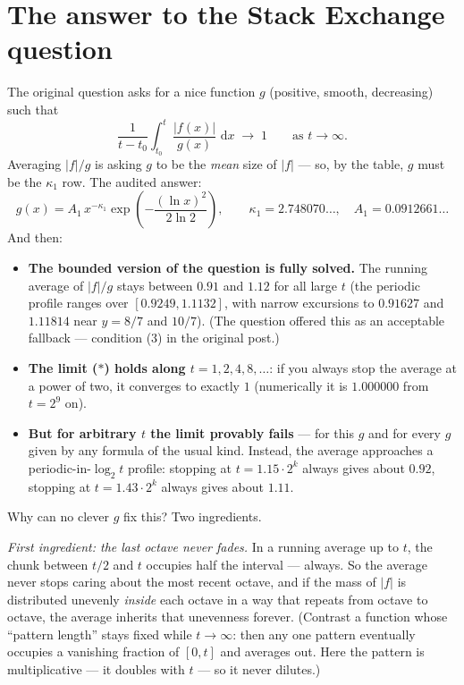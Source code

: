 \documentclass[11pt,oneside]{article}
\theoremstyle{remark}
\newcommand{\dd}{\,\mathrm d}
\begin{document}
\section{The answer to the Stack Exchange question}
\label{sec:answer}

The original question asks for a nice function $g$ (positive, smooth,
decreasing) such that
\[
 \frac{1}{t-t_0}\int_{t_0}^{t}\frac{|f(x)|}{g(x)}\,\dd x
 \;\longrightarrow\;1
 \qquad\text{as } t\to\infty .
 \tag{$\ast$}
\]
Averaging $|f|/g$ is asking $g$ to be the \emph{mean} size of $|f|$
--- so, by the table, $g$ must be the $\kappa_1$ row.  The audited
answer:
\[
 \boxed{\;
 g(x)=A_1\,x^{-\kappa_1}
 \exp\!\left(-\frac{(\ln x)^2}{2\ln 2}\right),
 \qquad
 \kappa_1=2.748070\ldots,\quad
 A_1=0.0912661\ldots
 \;}
\]
And then:

\begin{itemize}
\item \textbf{The bounded version of the question is fully solved.}
The running average of $|f|/g$ stays between $0.91$ and $1.12$ for all
large $t$ (the periodic profile ranges over $[0.9249,1.1132]$, with
narrow excursions to $0.91627$ and $1.11814$ near $y=8/7$ and $10/7$).
(The question offered this as an acceptable fallback ---
condition (3) in the original post.)
\item \textbf{The limit ($\ast$) holds along $t=1,2,4,8,\dots$}: if
you always stop the average at a power of two, it converges to
exactly $1$ (numerically it is $1.000000$ from $t=2^9$ on).
\item \textbf{But for arbitrary $t$ the limit provably fails} ---
for this $g$ and for every $g$ given by any formula of the usual
kind.  Instead, the average approaches a periodic-in-$\log_2t$
profile: stopping at $t=1.15\cdot2^k$ always gives about $0.92$,
stopping at $t=1.43\cdot2^k$ always gives about $1.11$.
\end{itemize}

Why can no clever $g$ fix this?  Two ingredients.

\emph{First ingredient: the last octave never fades.}  In a running
average up to $t$, the chunk between $t/2$ and $t$ occupies half the
interval --- always.  So the average never stops caring about the most
recent octave, and if the mass of $|f|$ is distributed unevenly
\emph{inside} each octave in a way that repeats from octave to octave,
the average inherits that unevenness forever.  (Contrast a function
whose ``pattern length'' stays fixed while $t\to\infty$: then any one
pattern eventually occupies a vanishing fraction of $[0,t]$ and
averages out.  Here the pattern is multiplicative --- it doubles with
$t$ --- so it never dilutes.)
\end{document}
